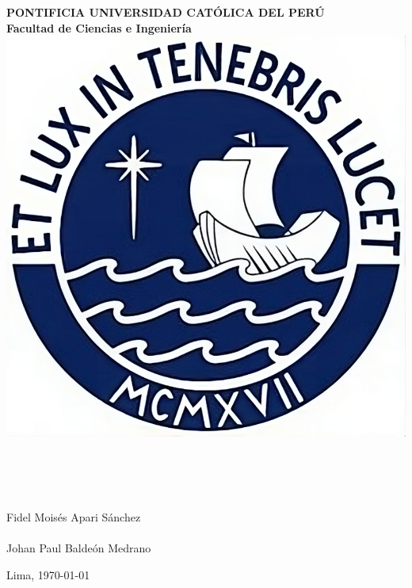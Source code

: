 \begin{titlepage}

\begin{center}
{\Large \bf PONTIFICIA UNIVERSIDAD CATÓLICA DEL PERÚ}\\
\vspace{5mm} 
{\Large \bf Facultad de Ciencias e Ingeniería}\\
\vspace{1cm}
\includegraphics[scale=0.2]{Imagenes/escudo_pucp.jpeg}
\vspace{1cm}

\Large{\textbf{\thesisTitle}} \\[4pt]
\vspace{1cm} 

\textbf{\thesisType} \\[0.7cm]
\vspace{1cm} 
\textbf{\autor} \\[3.8pt]  
\large{Fidel Moisés Apari Sánchez}\\
\vspace{2cm}
\asesor\\
\large{Johan Paul Baldeón Medrano }\\
    
\vspace{0.75cm}

{Lima, \today}
\end{center}
\end{titlepage}